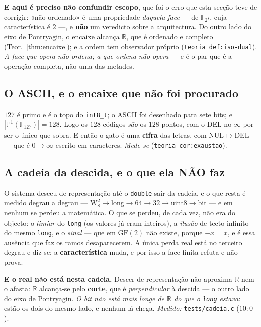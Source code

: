 \documentclass[11pt,a4paper]{article}
\newcommand{\code}[1]{\texttt{\small #1}}
\newcommand{\leitura}[1]{\code{#1}}
\begin{document}
\textbf{E aqui é preciso não confundir escopo}, que foi o erro que esta
secção teve de corrigir: «não ordenado» é uma propriedade
\emph{daquela face} --- de $\mathbb{F}_{2^8}$, cuja característica é
$2$ ---, e \textbf{não} um veredicto sobre a arquitectura. Do outro lado
do eixo de Pontryagin, o encaixe alcança $\mathbb{R}$, que é ordenado e
completo (Teor.~\ref{thm:encaixe}); e a ordem tem observador próprio
(\leitura{teoria def:iso-dual}). \emph{A face que opera não ordena; a que
ordena não opera} --- e é o par que é a operação completa, não uma das
metades.

\subsection*{O ASCII, e o encaixe que não foi procurado}
$127$ é primo e é o topo do \code{int8\_t}; o ASCII foi desenhado para
sete bits; e $|\mathbb{P}^1(\mathbb{F}_{127})|=128$. Logo os $128$
códigos \emph{são} os $128$ pontos, com o DEL no $\infty$ por ser o
único que sobra. E então o gato é uma \textbf{cifra} das letras, com
$\mathrm{NUL}\mapsto\mathrm{DEL}$ --- que é $0\mapsto\infty$ escrito em
caracteres. \emph{Mede-se} (\leitura{teoria cor:exaustao}).

\subsection*{A cadeia da descida, e o que ela NÃO faz}
O sistema desceu de representação até o \code{double} sair da cadeia, e o que
resta é medido degrau a degrau ---
$\mathrm{W}_8^{2}\to\text{long}\to64\to32\to\text{uint8}\to\text{bit}$ ---
e em nenhum se perdeu a matemática. O que se perdeu, de cada vez, não era
do objecto: o \emph{limiar} do \code{long} (os valores já eram inteiros), a
\emph{ilusão} de tecto infinito do mesmo \code{long}, e o \emph{sinal} --- que
em $\mathrm{GF}(2)$ não existe, porque $-x=x$, e é essa ausência que faz
os ramos desaparecerem. A única perda real está no terceiro degrau e
diz-se: a \textbf{característica} muda, e por isso a face finita refuta e
não prova.

\textbf{E o real não está nesta cadeia.} Descer de representação não
aproxima $\mathbb{R}$ nem o afasta: $\mathbb{R}$ alcança-se pelo
\textbf{corte}, que é \emph{perpendicular} à descida --- o outro lado do
eixo de Pontryagin. \emph{O bit não está mais longe de $\mathbb{R}$ do
que o \code{long} estava}: estão os dois do mesmo lado, e nenhum lá chega.
\emph{Medido:} \code{tests/cadeia.c} ($10{:}0$).
\end{document}
